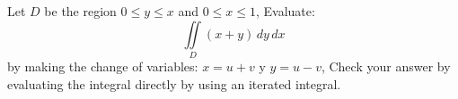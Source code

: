 \noindent Let $D$ be the region $0 \leq y \leq x$ and $0 \leq x \leq 1$,  Evaluate:
\[\displaystyle\iint\limits_D (x+y) \, dy \, dx\]
\noindent by making the change of variables: $x = u+v$ y $y = u-v$, Check your answer by evaluating the integral
directly by using an iterated integral.
\vspace{12pt}
